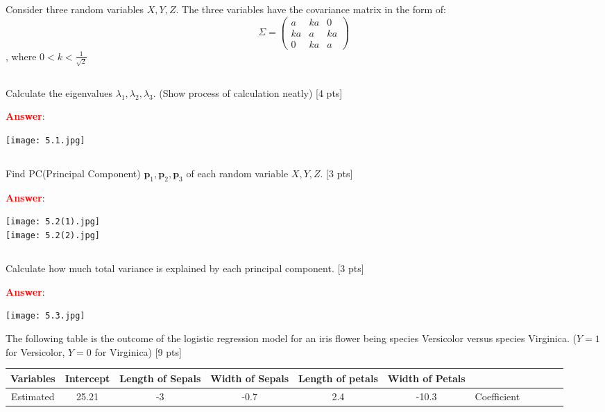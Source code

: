 \documentclass{homework}
\begin{document}
    \exercise*

    Consider three random variables $X,Y,Z$. The three variables have the covariance matrix in the form of: 
    $$ \Sigma = \left( \begin{matrix} a & ka & 0 \\ ka & a & ka \\ 0 & ka & a \end{matrix} \right) $$, where $ 0 < k < \frac{1}{\sqrt{2}}$\\


    \subsection{}
    Calculate the eigenvalues $\lambda_1,\lambda_2,\lambda_3$. (Show process of calculation neatly) [4 pts]
    
    \textbf{\textcolor{red}{Answer}}: 
    \begin{center}
    \texttt{[image: 5.1.jpg]}
    \end{center}
    \subsection{}
    Find PC(Principal Component) $\textbf{p}_1,\textbf{p}_2,\textbf{p}_3$ of each random variable $X,Y,Z$. [3 pts]
    
    \textbf{\textcolor{red}{Answer}}:
    
    \texttt{[image: 5.2(1).jpg]} \\
    \texttt{[image: 5.2(2).jpg]}
    
    \subsection{}
    Calculate how much total variance is explained by each principal component. [3 pts]
    
    \textbf{\textcolor{red}{Answer}}:
    
    \texttt{[image: 5.3.jpg]}
    
    \vspace{10mm}
        
        \exercise*
    The following table is the outcome of the logistic regression model for an iris flower being species Versicolor versus species Virginica. ($Y=1$ for Versicolor, $Y=0$ for Virginica) [9 pts]
    \begin{table}[!h]
    \begin{center}
    \begin{tabular}{|c|c|c|c|c|c|}
    \hline
    Variables & Intercept  & Length of Sepals  & Width of Sepals  & Length of petals  & Width of Petals  \\ \hline
    Estimated  & 25.21  & -3  & -0.7  & 2.4  & -10.3&
     Coefficient& &&&& \\ \hline
    \end{tabular}
    \end{center}
    \end{table}
\end{document}
